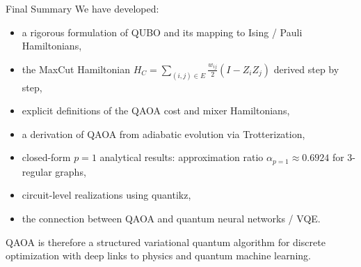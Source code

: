 \documentclass[aspectratio=169]{beamer}
\begin{document}
\begin{frame}{Final Summary}
We have developed:
\begin{itemize}
    \item a rigorous formulation of QUBO and its mapping to Ising / Pauli Hamiltonians,
    \item the MaxCut Hamiltonian \(H_C=\sum_{(i,j)\in E}\frac{w_{ij}}{2}(I-Z_iZ_j)\)
          derived step by step,
    \item explicit definitions of the QAOA cost and mixer Hamiltonians,
    \item a derivation of QAOA from adiabatic evolution via Trotterization,
    \item closed-form \(p=1\) analytical results: approximation ratio
          \(\alpha_{p=1}\approx 0.6924\) for 3-regular graphs,
    \item circuit-level realizations using quantikz,
    \item the connection between QAOA and quantum neural networks / VQE.
\end{itemize}

\medskip
QAOA is therefore a structured variational quantum algorithm for discrete
optimization with deep links to physics and quantum machine learning.
\end{frame}
\end{document}
